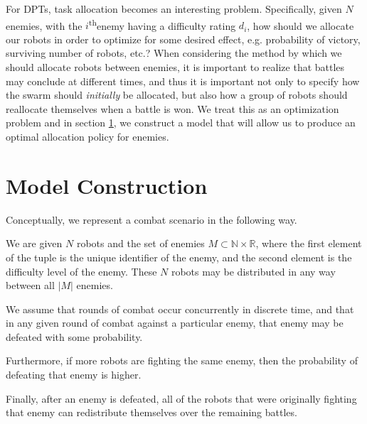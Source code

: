\documentclass[11pt]{article}
\theoremstyle{definition}
\newcommand{\abs}[1]{\left\vert{#1}\right\vert}
\renewcommand{\th}{\textsuperscript{th}}
\begin{document}
For DPTs, task allocation becomes an interesting problem.
%
Specifically, given $N$ enemies, with the $i$\th enemy having a difficulty
rating $d_i$, how should we allocate our robots in order to optimize for some
desired effect, e.g. probability of victory, surviving number of robots, etc.?
%
When considering the method by which we should allocate robots between enemies,
it is important to realize that battles may conclude at different times, and
thus it is important not only to specify how the swarm should \emph{initially}
be allocated, but also how a group of robots should reallocate themselves when
a battle is won.
%
We treat this as an optimization problem and in section \ref{sec:model}, we
construct a model that will allow us to produce an optimal allocation policy
for enemies.

\section{Model Construction}
\label{sec:model}

Conceptually, we represent a combat scenario in the following way.

We are given $N$ robots and the set of enemies
$M \subset \mathbb{N} \times \mathbb{R}$,
where the first element of the tuple is the unique identifier
of the enemy, and the second element is the difficulty level
of the enemy. These $N$ robots may be distributed
in any way between all $\abs{M}$ enemies.

We assume that rounds of combat occur concurrently in discrete time,
and that in any given round of combat against a
particular enemy, that enemy may be defeated
with some probability.

Furthermore, if more robots are fighting
the same enemy, then the probability of
defeating that enemy is higher.

Finally, after an enemy is defeated, all of
the robots that were originally fighting
that enemy can redistribute themselves
over the remaining battles.
\end{document}
